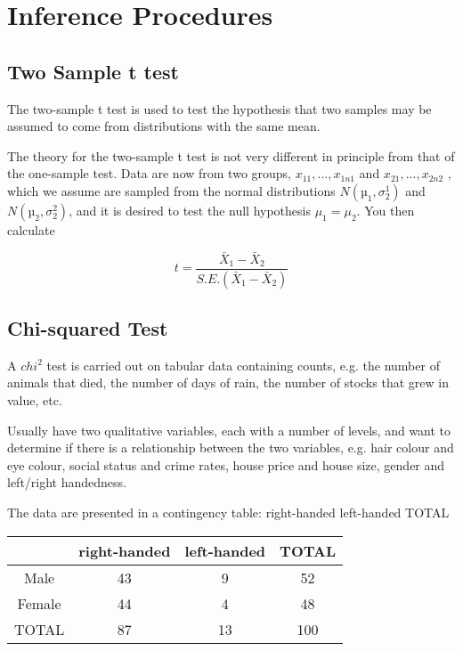\chapter{Inference Procedures}
\section{Two Sample t test}

The two-sample t test is used to test the hypothesis that two samples may
be assumed to come from distributions with the same mean.

The theory for the two-sample t test is not very different in principle from
that of the one-sample test. Data are now from two groups, $x_{11}, . . . , x_{1n1}$
and $x_{21}, . . . , x_{2n2}$ , which we assume are sampled from the normal distributions
$N(µ_{1}, \sigma^{1}_{2} )$ and
$N(µ_{2}, \sigma^{2}_{2} )$, and it is desired to test the null hypothesis
$\mu_{1} = \mu_{2}$. You then calculate

\[
t = \frac{\bar{X}_{1}-\bar{X}_{2}}{S.E.(\bar{X}_{1}-\bar{X}_{2})}
\]

\section{Chi-squared Test}

A $chi^2$ test is carried out on tabular data containing counts, e.g. the
number of animals that died, the number of days of rain, the
number of stocks that grew in value, etc.

Usually have two qualitative variables, each with a number of
levels, and want to determine if there is a relationship between the
two variables, e.g. hair colour and eye colour, social status and
crime rates, house price and house size, gender and left/right
handedness.

The data are presented in a contingency table:
right-handed left-handed TOTAL

\begin{tabular}{|c|c|c|c|}
  \hline
  & right-handed &left-handed & TOTAL\\\hline
  Male & 43 & 9 & 52 \\
  Female & 44 & 4 & 48 \\
  TOTAL & 87 & 13 & 100 \\
  \hline
\end{tabular}



